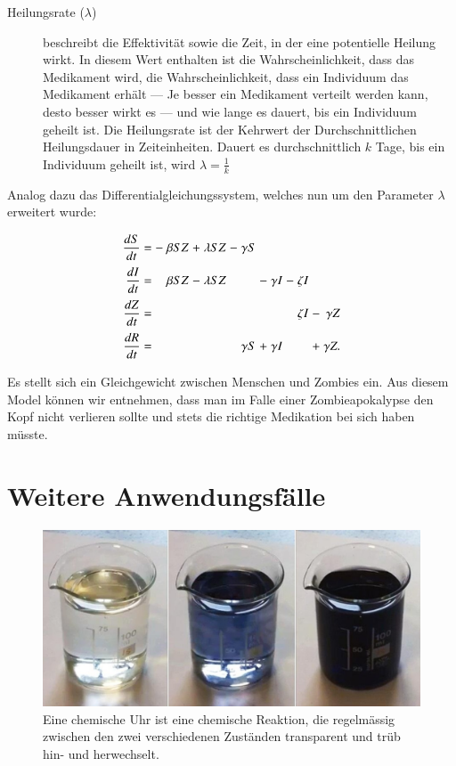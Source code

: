 \begin{refsection}
\begin{description}
  \item [Heilungsrate ($\lambda$)] beschreibt die Effektivität sowie die Zeit, in der eine potentielle Heilung wirkt. In diesem Wert enthalten ist die Wahrscheinlichkeit, dass das Medikament wird, die Wahrscheinlichkeit, dass ein Individuum das Medikament erhält --- Je besser ein Medikament verteilt werden kann, desto besser wirkt es --- und wie lange es dauert, bis ein Individuum geheilt ist. Die Heilungsrate ist der Kehrwert der Durchschnittlichen Heilungsdauer in Zeiteinheiten. Dauert es durchschnittlich $k$ Tage, bis ein Individuum geheilt ist, wird $\lambda = \frac{1}{k}$ 
\end{description}

Analog dazu das Differentialgleichungssystem, welches nun um den Parameter $\lambda$ erweitert wurde:
\[
\arraycolsep=1.4pt\def\arraystretch{2.2}
  \begin{array}{rccrcrcrcrcrcr}
   \displaystyle\frac{dS}{dt} & = &-& \beta S Z  &+& \lambda S Z   &-&  \gamma S & &         & & & & \\
   \displaystyle\frac{dI}{dt} & = & & \beta S Z  &-& \lambda S Z   & &           &-&\gamma I &-& \zeta I\\
   \displaystyle\frac{dZ}{dt} & = & &            & &               & &           & &         & & \zeta I  &-& \gamma Z \\   
   \displaystyle\frac{dR}{dt} & = & &            & &               & &  \gamma S &+&\gamma I & &          &+& \gamma Z.
 \end{array}
\]

Es stellt sich ein Gleichgewicht zwischen Menschen und Zombies ein. Aus diesem Model können wir entnehmen, dass man im Falle einer Zombieapokalypse den Kopf nicht verlieren sollte und stets die richtige Medikation bei sich haben müsste.

\section{Weitere Anwendungsfälle}
\begin{figure}[b]
	\centering
	\includegraphics[width=.5\textwidth]{sir/images/chemical_clock}
  \caption[Chemische Uhr]{Eine chemische Uhr ist eine chemische Reaktion, die regelmässig zwischen den zwei verschiedenen Zuständen transparent und trüb hin- und herwechselt.\cite{sir:chemical_clock}
}
\end{figure}


\end{refsection}
